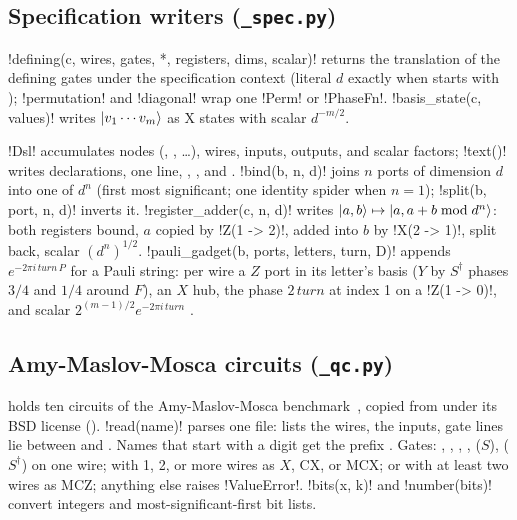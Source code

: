 \subsection{Specification writers (\texttt{\_spec.py})}

\py!defining(c, wires, gates, *, registers, dims, scalar)! returns the translation of the
defining gates under the specification context (literal $d$ exactly when  starts with
); \py!permutation! and \py!diagonal! wrap one \py!Perm! or \py!PhaseFn!.
\py!basis_state(c, values)! writes $\lvert v_1\cdots v_m \rangle$ as X states with scalar
$d^{-m/2}$.

\py!Dsl! accumulates nodes (, , \dots), wires, inputs, outputs, and scalar
factors; \py!text()! writes declarations, one  line, , ,
and . \py!bind(b, n, d)! joins $n$ ports of dimension $d$ into one
of $d^n$ (first most significant; one identity spider when $n=1$); \py!split(b, port, n, d)!
inverts it. \py!register_adder(c, n, d)! writes $\lvert a,b \rangle\mapsto\lvert a, a+b \bmod d^n \rangle$: both
registers bound, $a$ copied by \azx!Z(1 -> 2)!, added into $b$ by \azx!X(2 -> 1)!, split back,
scalar $(d^n)^{1/2}$. \py!pauli_gadget(b, ports, letters, turn, D)! appends
$e^{-2\pi i\,\mathit{turn}\,P}$ for a Pauli string: per wire a $Z$ port in its letter's basis
($Y$ by $S^\dagger$ phases $3/4$ and $1/4$ around $F$), an $X$ hub, the phase
$2\,\mathit{turn}$ at index 1 on a \azx!Z(1 -> 0)!, and scalar
$2^{(m-1)/2}e^{-2\pi i\,\mathit{turn}}$ \cite{cowtan2020phase}.

\subsection{Amy-Maslov-Mosca circuits (\texttt{\_qc.py})}

 holds ten  circuits of the Amy-Maslov-Mosca
benchmark~\cite{amy2014polynomial}, copied from 
under its BSD license (). \py!read(name)! parses one file:  lists
the wires,  the inputs, gate lines lie between  and . Names that
start with a digit get the prefix . Gates: , , , ,
 ($S$),  ($S^\dagger$) on one wire;  with 1, 2, or more wires as
$X$, CX, or MCX;  or  with at least two wires as MCZ; anything else raises
\py!ValueError!. \py!bits(x, k)! and \py!number(bits)! convert integers and most-significant-first
bit lists.

